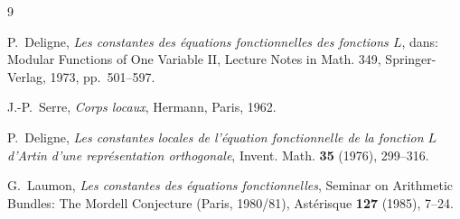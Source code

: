 \documentclass[12pt,a4paper]{article}
\theoremstyle{plain}
\theoremstyle{definition}
\theoremstyle{remark}
\begin{document}
\begin{thebibliography}{9}

P.~Deligne, \textit{Les constantes des \'equations fonctionnelles des fonctions $L$}, dans: Modular Functions of One Variable II, Lecture Notes in Math. 349, Springer-Verlag, 1973, pp.~501--597.

J.-P.~Serre, \textit{Corps locaux}, Hermann, Paris, 1962.

P.~Deligne, \textit{Les constantes locales de l'\'equation fonctionnelle de la fonction $L$ d'Artin d'une repr\'esentation orthogonale}, Invent. Math. \textbf{35} (1976), 299--316.

G.~Laumon, \textit{Les constantes des \'equations fonctionnelles}, Seminar on Arithmetic Bundles: The Mordell Conjecture (Paris, 1980/81), Ast\'erisque \textbf{127} (1985), 7--24.

\end{thebibliography}
\end{document}
